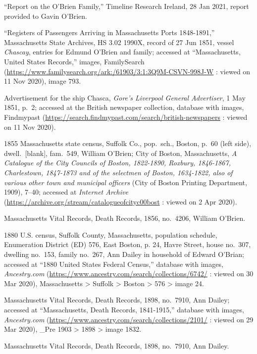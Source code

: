 \begin{thebibliography}{999}
``Report on the O'Brien Family,'' Timeline Research Ireland, 28 Jan 2021, report provided to Gavin O'Brien.

``Registers of Passengers Arriving in Massachusetts Ports 1848-1891,'' Massachusetts State Archives, HS 3.02 1990X, record of 27 Jun 1851, vessel \textit{Chascay}, entries for Edmund O'Brien and family; accessed at ``Massachusetts, United States Records,'' images, FamilySearch (\url{https://www.familysearch.org/ark:/61903/3:1:3Q9M-CSVN-998J-W} : viewed on 11 Nov 2020), image 793.

Advertisement for the ship Chasca, \textit{Gore's Liverpool General Advertiser}, 1 May 1851, p.\ 2; accessed at the British newspaper collection, database with images, Findmypast (\url{https://search.findmypast.com/search/british-newspapers} : viewed on 11 Nov 2020).

1855 Massachusetts state census, Suffolk Co., pop.\ sch., Boston, p.\ 60 (left side), dwell.\ [blank], fam.\ 549,  William O'Brien; City of Boston, Massachusetts, \textit{A Catalogue of the City Councils of Boston, 1822-1890, Roxbury, 1846-1867, Charlestown, 1847-1873 and of the selectmen of Boston, 1634-1822, also of various other town and municipal officers} (City of Boston Printing Department, 1909), 7--40; accessed at \textit{Internet Archive} (\url{https://archive.org/stream/catalogueofcityc00bost} : viewed on 2 Apr 2020).

Massachusetts Vital Records, Death Records, 1856, no.\ 4206, William O'Brien.

1880 U.S. census, Suffolk County, Massachusetts, population schedule, Enumeration District (ED) 576, East Boston, p. 24, Havre Street, house no.\ 307, dwelling no.\ 153, family no.\ 267, Ann Dailey in household of Edward O'Brian; accessed at ``1880 United States Federal Census,'' database with images, \textit{Ancestry.com} (\url{https://www.ancestry.com/search/collections/6742/} : viewed on 30 Mar 2020), Massachusetts > Suffolk > Boston > 576 > image 24.

Massachusetts Vital Records, Death Records, 1898, no.\ 7910, Ann Dailey; accessed at ``Massachusetts, Death Records, 1841-1915,'' database with images, \textit{Ancestry.com} (\url{https://www.ancestry.com/search/collections/2101/} : viewed on 29 Mar 2020), \_Pre 1903 > 1898 > image 1832.

Massachusetts Vital Records, Death Records, 1898, no.\ 7910, Ann Dailey.

\end{thebibliography}